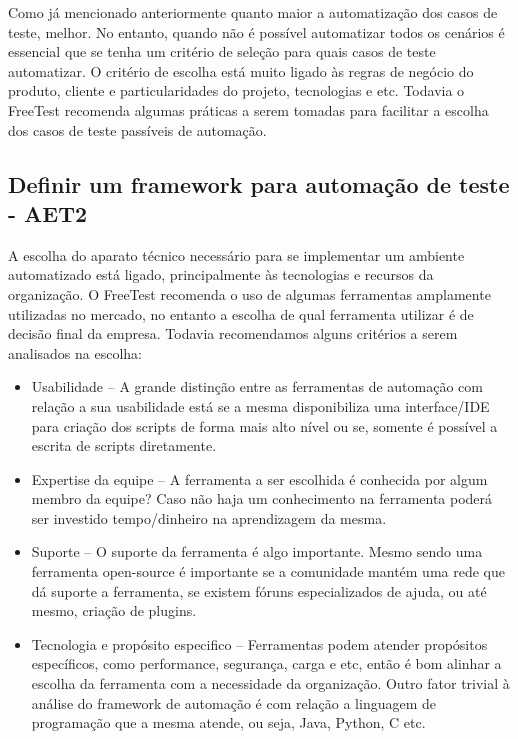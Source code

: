 Como já mencionado anteriormente quanto maior a automatização dos casos de teste, melhor. No entanto, quando não é possível automatizar todos os cenários é essencial que se tenha um critério de seleção para quais casos de teste automatizar. O critério de escolha está muito ligado às regras de negócio do produto, cliente e particularidades do projeto, tecnologias e etc. Todavia o FreeTest recomenda algumas práticas a serem tomadas para facilitar a escolha dos casos de teste passíveis de automação.

\subsection{Definir um framework para automação de teste - AET2}

A escolha do aparato técnico necessário para se implementar um ambiente automatizado está ligado, principalmente às tecnologias e recursos da organização. O FreeTest recomenda o uso de algumas ferramentas amplamente utilizadas no mercado, no entanto a escolha de qual ferramenta utilizar é de decisão final da empresa. Todavia recomendamos alguns critérios a serem analisados na escolha:

\begin{itemize}
\item Usabilidade – A grande distinção entre as ferramentas de automação com relação a sua usabilidade está se a mesma disponibiliza uma interface/IDE para criação dos scripts de forma mais alto nível ou se, somente é possível a escrita de scripts diretamente.
\item Expertise da equipe – A ferramenta a ser escolhida é conhecida por algum membro da equipe? Caso não haja um conhecimento na ferramenta poderá ser investido tempo/dinheiro na aprendizagem da mesma.
\item Suporte – O suporte da ferramenta é algo importante. Mesmo sendo uma ferramenta open-source é importante se a comunidade mantém uma rede que dá suporte a ferramenta, se existem fóruns especializados de ajuda, ou até mesmo, criação de plugins.
\item Tecnologia e propósito especifico – Ferramentas podem atender propósitos específicos, como performance, segurança, carga e etc, então é bom alinhar a escolha da ferramenta com a necessidade da organização. Outro fator trivial à análise do framework de automação é com relação a linguagem de programação que a mesma atende, ou seja, Java, Python, C etc.
\end{itemize}


